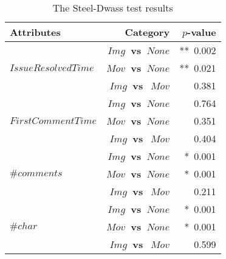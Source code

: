 \begin{table}[t]
  \begin{center}
  \caption{The Steel-Dwass test results}
  \begin{tabular}{l r|r}
    \toprule
    Attributes & Category & $p$-value\\
    \midrule
     & \bf{$Img$~vs~$None$} & **~0.002 \\
     $IssueResolvedTime$ & \bf{$Mov$~vs~$None$} & **~0.021 \\
     & \bf{$Img$~vs~$~Mov$} & 0.381 \\
    \midrule
     & \bf{$Img$~vs~$None$} & 0.764 \\
     $FirstCommentTime$ & \bf{$Mov$~vs~$None$} & 0.351 \\
     & \bf{$Img$~vs~$~Mov$} & 0.404 \\
    \midrule
     & \bf{$Img$~vs~$None$} & *~0.001 \\
     $\#comments$ & \bf{$Mov$~vs~$None$} & *~0.001 \\
     & \bf{$Img$~vs~$~Mov$} & 0.211 \\
    \midrule
     & \bf{$Img$~vs~$None$} & *~0.001 \\
     $\#char$  & \bf{$Mov$~vs~$None$} & *~0.001 \\
     & \bf{$Img$~vs~$~Mov$} & 0.599 \\
    \bottomrule
  \end{tabular}\\
  \label{tab:Steel-Dwass-test}
  \end{center}
\end{table}